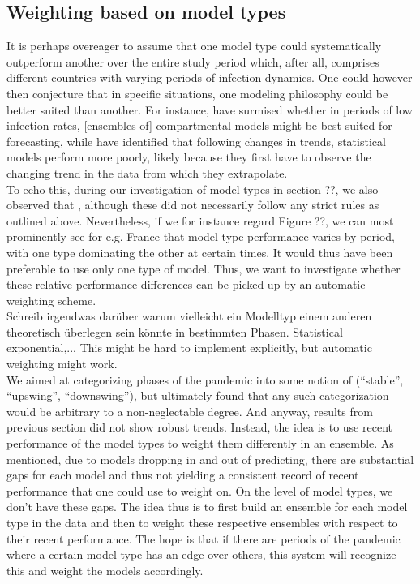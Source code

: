 \subsection{Weighting based on model types}
It is perhaps overeager to assume that one model type could systematically outperform another over the entire study period which, after all, comprises different countries with varying periods of infection dynamics. One could however then conjecture that in specific situations, one modeling philosophy could be better suited than another. For instance, \cite{taylor_combining_2021} have surmised whether in periods of low infection rates, [ensembles of] compartmental models might be best suited for forecasting, while \citep{bracher_pre-registered_2021} have identified that following changes in trends, statistical models perform more poorly, likely because they first have to observe the changing trend in the data from which they extrapolate.\\
To echo this, during our investigation of model types in section ??, we also observed that , although these did not necessarily follow any strict rules as outlined above. Nevertheless, if we for instance regard Figure ??, we can most prominently see for e.g. France that model type performance varies by period, with one type dominating the other at certain times. It would thus have been preferable to use only one type of model. Thus, we want to investigate whether these relative performance differences can be picked up by an automatic weighting scheme. \\
Schreib irgendwas darüber warum vielleicht ein Modelltyp einem anderen theoretisch überlegen sein könnte in bestimmten Phasen. Statistical exponential,... This might be hard to implement explicitly, but automatic weighting might work.\\
We aimed at categorizing phases of the pandemic into some notion of (``stable'', ``upswing'', ``downswing''), but ultimately found that any such categorization would be arbitrary to a non-neglectable degree. And anyway, results from previous section did not show robust trends. Instead, the idea is to use recent performance of the model types to weight them differently in an ensemble. As mentioned, due to models dropping in and out of predicting, there are substantial gaps for each model and thus not yielding a consistent record of recent performance that one could use to weight on. On the level of model types, we don't have these gaps. The idea thus is to first build an ensemble for each model type in the data and then to weight these respective ensembles with respect to their recent performance. The hope is that if there are periods of the pandemic where a certain model type has an edge over others, this system will recognize this and weight the models accordingly. \\
